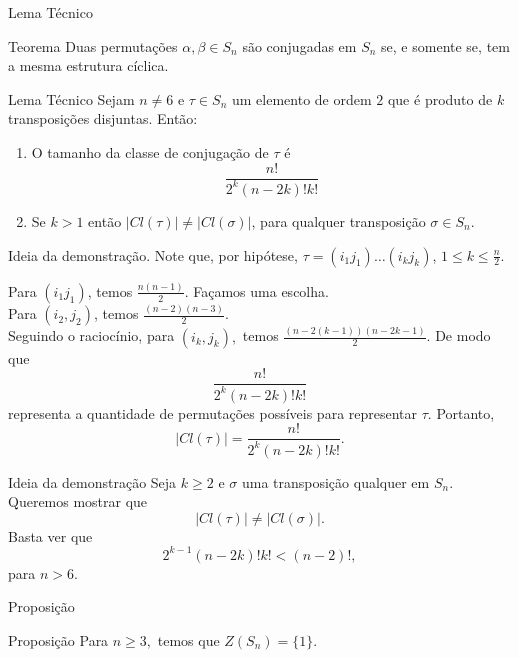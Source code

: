 \begin{frame}{Lema Técnico}
\begin{block}{Teorema}
    Duas permutações $\alpha, \beta \in S_n$ são conjugadas em $S_n$ se, e somente se, tem a mesma estrutura cíclica.
\end{block}
  
  
  \begin{block}{Lema Técnico}
    Sejam $n\neq 6$ e $\tau \in S_n$ um elemento de ordem $2$ que é produto de $k$ transposições disjuntas. Então:

    \begin{enumerate}
        \item O tamanho da classe de conjugação de $\tau$ é
        $$\frac{n!}{2^k(n-2k)!k!}$$

        \item Se $k>1$ então $\vert Cl(\tau)\vert \neq \vert Cl(\sigma)\vert$, para qualquer transposição $\sigma \in S_n$.
    \end{enumerate}
  \end{block}
\end{frame}
\begin{frame}{}
  \begin{block}{Ideia da demonstração.}
    Note que, por hipótese, $\tau=(i_1j_1)\dots(i_kj_k)$, $1\leq k \leq \frac{n}{2}$.
   
    Para $(i_1j_1)$, temos $\frac{n(n-1)}{2}$. Façamos uma escolha.\\
    \vspace{0.3 cm}
    Para $(i_2,j_2)$, temos $\frac{(n-2)(n-3)}{2}$.\\
    \vspace{0.3 cm}
    Seguindo o raciocínio, para $(i_k,j_k),$ temos $\frac{(n-2(k-1))(n-2k-1)}{2}$. De modo que
    $$\frac{n!}{2^k(n-2k)!k!}$$
    representa a quantidade de permutações possíveis para representar  $\tau$.
    \vspace{0.3 cm}
    Portanto,
    $$\vert Cl(\tau)\vert = \frac{n!}{2^k(n-2k)!k!}.$$
  \end{block}
\end{frame}

\begin{frame}{}
    \begin{block}{Ideia da demonstração}
        Seja $k\geq 2$ e $\sigma$ uma transposição qualquer em $S_n$.
        Queremos mostrar que 
        $$\vert Cl(\tau)\vert \neq \vert Cl(\sigma)\vert.$$
        Basta ver que 
        $$2^{k-1}(n-2k)! k! < (n-2)!,
        $$
para $n>6$.
    \end{block}
\end{frame}

\begin{frame}{Proposição}
    \begin{block}{Proposição}
    Para $n\geq 3,$ temos que $Z(S_n)=\{1\}.$
        
    \end{block}
\end{frame}


